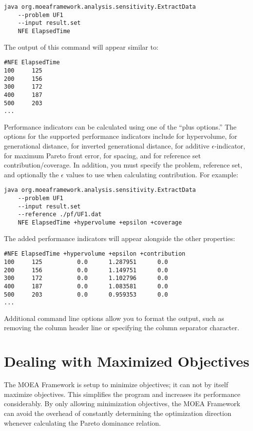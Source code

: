 \begin{lstlisting}[language=Plaintext]
java org.moeaframework.analysis.sensitivity.ExtractData
    --problem UF1
    --input result.set
    NFE ElapsedTime
\end{lstlisting}

The output of this command will appear similar to:

\begin{lstlisting}[language=Plaintext]
#NFE ElapsedTime
100     125
200     156
300     172
400     187
500     203
...
\end{lstlisting}

Performance indicators can be calculated using one of the ``plus options.''  The options for the supported performance indicators include  for hypervolume,  for generational distance,  for inverted generational distance,  for additive $\epsilon$-indicator,  for maximum Pareto front error,  for spacing, and  for reference set contribution/coverage.  In addition, you must specify the problem, reference set, and optionally the $\epsilon$ values to use when calculating contribution.  For example:

\begin{lstlisting}[language=Plaintext]
java org.moeaframework.analysis.sensitivity.ExtractData
    --problem UF1
    --input result.set
    --reference ./pf/UF1.dat
    NFE ElapsedTime +hypervolume +epsilon +coverage
\end{lstlisting}

The added performance indicators will appear alongside the other properties:

\begin{lstlisting}[language=Plaintext]
#NFE ElapsedTime +hypervolume +epsilon +contribution
100     125          0.0      1.287951      0.0
200     156          0.0      1.149751      0.0
300     172          0.0      1.102796      0.0
400     187          0.0      1.083581      0.0
500     203          0.0      0.959353      0.0
...
\end{lstlisting}

Additional command line options allow you to format the output, such as removing the column header line or specifying the column separator character.

\section{Dealing with Maximized Objectives}
\label{sect:maximizing}
The MOEA Framework is setup to minimize objectives; it can not by itself maximize objectives.  This simplifies the program and increases its performance considerably.  By only allowing minimization objectives, the MOEA Framework can avoid the overhead of constantly determining the optimization direction whenever calculating the Pareto dominance relation.

